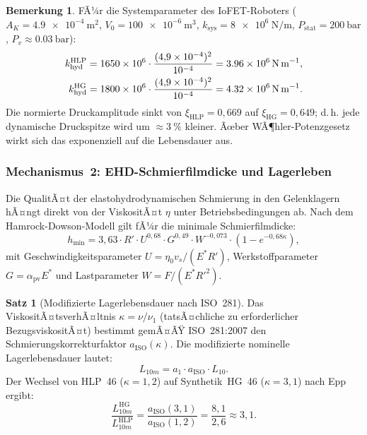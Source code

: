 ﻿\documentclass[a4paper,12pt]{scrreprt}
\theoremstyle{definition}
\newtheorem{bemerkung}{Bemerkung}[section]
\newtheorem{satz}{Satz}[section]
\begin{document}
\begin{bemerkung}
FÃ¼r die Systemparameter des IoFET-Roboters ($A_K = \SI{4.9e-4}{\meter\squared}$,
$V_0 = \SI{100e-6}{\meter\cubed}$,
$k_{\text{sys}} = \SI{8e6}{\newton\per\meter}$,
$P_{\text{stat}} = \SI{200}{\bar}$, $P_v \approx \SI{0.03}{\bar}$):
\begin{align*}
  k_{\text{hyd}}^{\text{HLP}} &= 1650 \times 10^6 \cdot
    \frac{(4{,}9 \times 10^{-4})^2}{10^{-4}}
    = \SI{3{,}96e6}{\newton\per\meter},\\
  k_{\text{hyd}}^{\text{HG}} &= 1800 \times 10^6 \cdot
    \frac{(4{,}9 \times 10^{-4})^2}{10^{-4}}
    = \SI{4{,}32e6}{\newton\per\meter}.
\end{align*}
Die normierte Druckamplitude sinkt von $\xi_{\text{HLP}} = 0{,}669$ auf
$\xi_{\text{HG}} = 0{,}649$; d.\,h. jede dynamische Druckspitze wird
um $\approx\SI{3}{\percent}$ kleiner. Ãœber WÃ¶hler-Potenzgesetz wirkt sich
das exponenziell auf die Lebensdauer aus.
\end{bemerkung}

\subsubsection{Mechanismus~2: EHD-Schmierfilmdicke und Lagerleben}

Die QualitÃ¤t der elastohydrodynamischen Schmierung in den Gelenklagern
hÃ¤ngt direkt von der ViskositÃ¤t $\eta$ unter Betriebsbedingungen ab.
Nach dem Hamrock-Dowson-Modell gilt fÃ¼r die minimale Schmierfilmdicke:
\begin{equation}
  h_{\min} = 3{,}63 \cdot R' \cdot U^{0{,}68} \cdot G^{0{,}49}
             \cdot W^{-0{,}073} \cdot (1 - e^{-0{,}68\kappa}),
  \label{eq:hamrock}
\end{equation}
mit Geschwindigkeitsparameter $U = \eta_0 v_s / (E^* R')$,
Werkstoffparameter $G = \alpha_{\text{pv}} E^*$ und
Lastparameter $W = F/(E^* {R'}^2)$.

\begin{satz}[Modifizierte Lagerlebensdauer nach ISO~281]
\label{satz:lagerlebensdauer}
Das ViskositÃ¤tsverhÃ¤ltnis $\kappa = \nu / \nu_1$ (tatsÃ¤chliche zu
erforderlicher BezugsviskositÃ¤t) bestimmt gemÃ¤ÃŸ ISO~281:2007 den
Schmierungskorrekturfaktor $a_{\text{ISO}}(\kappa)$. Die modifizierte
nominelle Lagerlebensdauer lautet:
\begin{equation}
  L_{10m} = a_1 \cdot a_{\text{ISO}} \cdot L_{10}.
  \label{eq:l10m}
\end{equation}
Der Wechsel von HLP~46 ($\kappa = 1{,}2$) auf Synthetik~HG~46
($\kappa = 3{,}1$) nach Epp~\cite{hydr2026} ergibt:
\begin{equation}
  \frac{L_{10m}^{\text{HG}}}{L_{10m}^{\text{HLP}}}
  = \frac{a_{\text{ISO}}(3{,}1)}{a_{\text{ISO}}(1{,}2)}
  = \frac{8{,}1}{2{,}6} \approx 3{,}1.
  \label{eq:lebensdauerfaktor}
\end{equation}
\end{satz}
\end{document}

